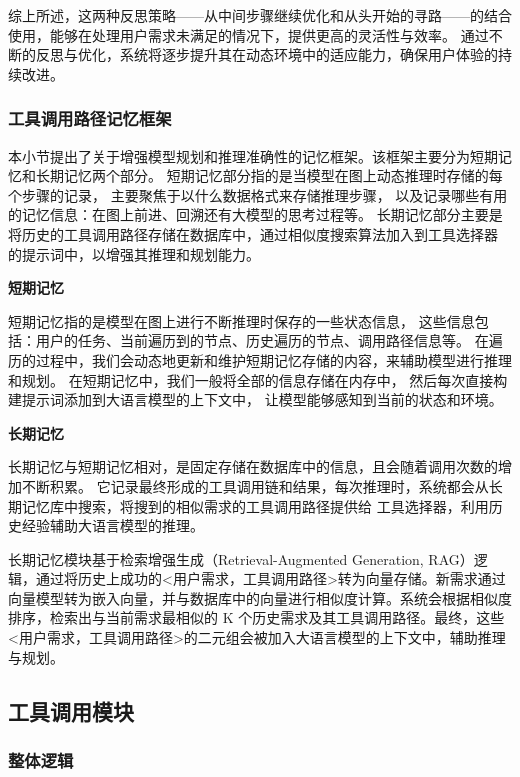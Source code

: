 综上所述，这两种反思策略——从中间步骤继续优化和从头开始的寻路——的结合使用，能够在处理用户需求未满足的情况下，提供更高的灵活性与效率。
通过不断的反思与优化，系统将逐步提升其在动态环境中的适应能力，确保用户体验的持续改进。

\subsubsection{工具调用路径记忆框架}

本小节提出了关于增强模型规划和推理准确性的记忆框架。该框架主要分为短期记忆和长期记忆两个部分。
短期记忆部分指的是当模型在图上动态推理时存储的每个步骤的记录，
主要聚焦于以什么数据格式来存储推理步骤，
以及记录哪些有用的记忆信息：在图上前进、回溯还有大模型的思考过程等。
长期记忆部分主要是将历史的工具调用路径存储在数据库中，通过相似度搜索算法加入到工具选择器
的提示词中，以增强其推理和规划能力。

\indent \textbf{短期记忆}

短期记忆指的是模型在图上进行不断推理时保存的一些状态信息，
这些信息包括：用户的任务、当前遍历到的节点、历史遍历的节点、调用路径信息等。
在遍历的过程中，我们会动态地更新和维护短期记忆存储的内容，来辅助模型进行推理和规划。
在短期记忆中，我们一般将全部的信息存储在内存中，
然后每次直接构建提示词添加到大语言模型的上下文中，
让模型能够感知到当前的状态和环境。

\indent \textbf{长期记忆}

长期记忆与短期记忆相对，是固定存储在数据库中的信息，且会随着调用次数的增加不断积累。
它记录最终形成的工具调用链和结果，每次推理时，系统都会从长期记忆库中搜索，将搜到的相似需求的工具调用路径提供给
工具选择器，利用历史经验辅助大语言模型的推理。

长期记忆模块基于检索增强生成（Retrieval-Augmented Generation, RAG）逻辑，通过将历史上成功的<用户需求，工具调用路径>转为向量存储。新需求通过向量模型转为嵌入向量，并与数据库中的向量进行相似度计算。系统会根据相似度排序，检索出与当前需求最相似的 K 个历史需求及其工具调用路径。最终，这些<用户需求，工具调用路径>的二元组会被加入大语言模型的上下文中，辅助推理与规划。

\subsection{工具调用模块}
\label{sec:real_tool_simulation}

\subsubsection{整体逻辑}

